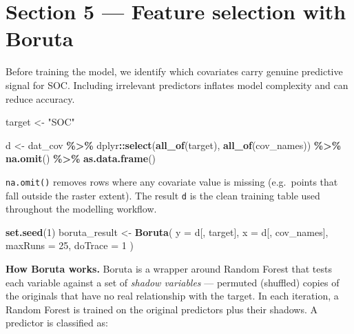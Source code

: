 \documentclass[
  10pt,
  b5paper,
  oneside]{book}
\newenvironment{Shaded}{\begin{snugshade}}{\end{snugshade}}
\newcommand{\AttributeTok}[1]{\textcolor[rgb]{0.13,0.29,0.53}{#1}}
\newcommand{\DecValTok}[1]{\textcolor[rgb]{0.00,0.00,0.81}{#1}}
\newcommand{\FunctionTok}[1]{\textcolor[rgb]{0.13,0.29,0.53}{\textbf{#1}}}
\newcommand{\NormalTok}[1]{#1}
\newcommand{\OtherTok}[1]{\textcolor[rgb]{0.56,0.35,0.01}{#1}}
\newcommand{\SpecialCharTok}[1]{\textcolor[rgb]{0.81,0.36,0.00}{\textbf{#1}}}
\newcommand{\StringTok}[1]{\textcolor[rgb]{0.31,0.60,0.02}{#1}}
\begin{document}
\section*{Section 5 --- Feature selection with Boruta}\label{section-5-feature-selection-with-boruta}

Before training the model, we identify which covariates carry genuine predictive signal for SOC. Including irrelevant predictors inflates model complexity and can reduce accuracy.

\begin{Shaded}
\begin{Highlighting}[]
\NormalTok{target }\OtherTok{\textless{}{-}} \StringTok{"SOC"}

\NormalTok{d }\OtherTok{\textless{}{-}}\NormalTok{ dat\_cov }\SpecialCharTok{\%\textgreater{}\%}
\NormalTok{  dplyr}\SpecialCharTok{::}\FunctionTok{select}\NormalTok{(}\FunctionTok{all\_of}\NormalTok{(target), }\FunctionTok{all\_of}\NormalTok{(cov\_names)) }\SpecialCharTok{\%\textgreater{}\%}
  \FunctionTok{na.omit}\NormalTok{() }\SpecialCharTok{\%\textgreater{}\%}
  \FunctionTok{as.data.frame}\NormalTok{()}
\end{Highlighting}
\end{Shaded}

\texttt{na.omit()} removes rows where any covariate value is missing (e.g.~points that fall outside the raster extent). The result \texttt{d} is the clean training table used throughout the modelling workflow.

\begin{Shaded}
\begin{Highlighting}[]
\FunctionTok{set.seed}\NormalTok{(}\DecValTok{1}\NormalTok{)}
\NormalTok{boruta\_result }\OtherTok{\textless{}{-}} \FunctionTok{Boruta}\NormalTok{(}
  \AttributeTok{y =}\NormalTok{ d[, target],}
  \AttributeTok{x =}\NormalTok{ d[, cov\_names],}
  \AttributeTok{maxRuns =} \DecValTok{25}\NormalTok{,}
  \AttributeTok{doTrace =} \DecValTok{1}
\NormalTok{)}
\end{Highlighting}
\end{Shaded}

\textbf{How Boruta works.} Boruta is a wrapper around Random Forest that tests each variable against a set of \emph{shadow variables} --- permuted (shuffled) copies of the originals that have no real relationship with the target. In each iteration, a Random Forest is trained on the original predictors plus their shadows. A predictor is classified as:
\end{document}
